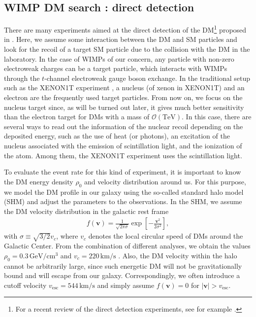 \documentclass[12pt,twoside,book]{article}
\begin{document}
\subsection{WIMP DM search : direct detection}
\label{sec:direct_detection}

There are many experiments aimed at the direct detection of the DM\footnote
{
  For a recent review of the direct detection experiments, see for example \cite{Undagoitia:2015gya}.
}
proposed in \cite{Goodman:1984dc}.
Here, we assume some interaction between the DM and SM particles and look for the recoil of a target SM particle due to the collision with the DM in the laboratory.
In the case of WIMPs of our concern, any particle with non-zero electroweak charges can be a target particle, which interacts with WIMPs through the $t$-channel electroweak gauge boson exchange.
In the traditional setup such as the XENON1T experiment \cite{Aprile:2012zx}, a nucleus (of xenon in XENON1T) and an electron are the frequently used target particles.
From now on, we focus on the nucleus target since, as will be turned out later, it gives much better sensitivity than the electron target for DMs with a mass of $\mathcal{O} (\mathrm{TeV})$.
In this case, there are several ways to read out the information of the nuclear recoil depending on the deposited energy, such as the use of heat (or photons), an excitation of the nucleus associated with the emission of scintillation light, and the ionization of the atom.
Among them, the XENON1T experiment uses the scintillation light.

To evaluate the event rate for this kind of experiment, it is important to know the DM energy density $\rho_0$ and velocity distribution around us.
For this purpose, we model the DM profile in our galaxy using the so-called standard halo model (SHM) and adjust the parameters to the observations.
In the SHM, we assume the DM velocity distribution in the galactic rest frame
\begin{align}
  f(\bm{v}) = \frac{1}{\sqrt{2\pi \sigma}} \exp \left[ -\frac{\bm{v}^2}{2 \sigma^2} \right],
\end{align}
with $\sigma \equiv \sqrt{3/2} v_c$, where $v_c$ denotes the local circular speed of DMs around the Galactic Center.
From the combination of different analyses, we obtain the values $\rho_0 = 0.3\,\mathrm{GeV / cm^3}$ and $v_c = 220\,\mathrm{km/s}$ \cite{Kerr:1986hz,Green:2011bv}.
Also, the DM velocity within the halo cannot be arbitrarily large, since such energetic DM will not be gravitationally bound and will escape from our galaxy.
Correspondingly, we often introduce a cutoff velocity $v_{\mathrm{esc}} = 544\,\mathrm{km / s}$ \cite{Smith:2006ym} and simply assume $f(\bm{v}) = 0$ for $|\bm{v}| > v_{\mathrm{esc}}$.
\end{document}
